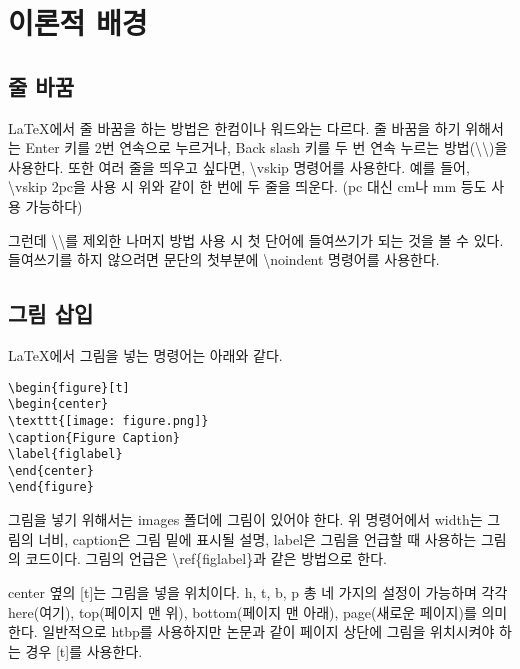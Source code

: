 \section{이론적 배경}

\subsection{줄 바꿈}

\LaTeX 에서 줄 바꿈을 하는 방법은 한컴이나 워드와는 다르다.
줄 바꿈을 하기 위해서는 Enter 키를 2번 연속으로 누르거나, 
Back slash 키를 두 번 연속 누르는 방법(\textbackslash \textbackslash)을 사용한다. 
또한 여러 줄을 띄우고 싶다면, \textbackslash vskip 명령어를 사용한다. 
예를 들어, \textbackslash vskip 2pc을 사용 시
\vskip 2pc
위와 같이 한 번에 두 줄을 띄운다. (pc 대신 cm나 mm 등도 사용 가능하다)


그런데 \textbackslash \textbackslash 를 제외한 나머지 방법 사용 시 첫 단어에 들여쓰기가 되는 것을 볼 수 있다. 들여쓰기를 하지 않으려면 문단의 첫부분에 \textbackslash noindent 명령어를 사용한다.

\subsection{그림 삽입}

\LaTeX 에서 그림을 넣는 명령어는 아래와 같다.
\begin{lstlisting}
\begin{figure}[t]
\begin{center}
\texttt{[image: figure.png]}
\caption{Figure Caption}
\label{figlabel}
\end{center}
\end{figure}
\end{lstlisting}
그림을 넣기 위해서는 images 폴더에 그림이 있어야 한다.
위 명령어에서 width는 그림의 너비, caption은 그림 밑에 표시될 설명, label은 그림을 언급할 때 사용하는 그림의 코드이다. 그림의 언급은 \textbackslash ref\{figlabel\}과 같은 방법으로 한다.

\noindent center 옆의 [t]는 그림을 넣을 위치이다. h, t, b, p 총 네 가지의 설정이 가능하며 각각 here(여기), top(페이지 맨 위), bottom(페이지 맨 아래), page(새로운 페이지)를 의미한다.
일반적으로 htbp를 사용하지만 논문과 같이 페이지 상단에 그림을 위치시켜야 하는 경우 [t]를 사용한다.

